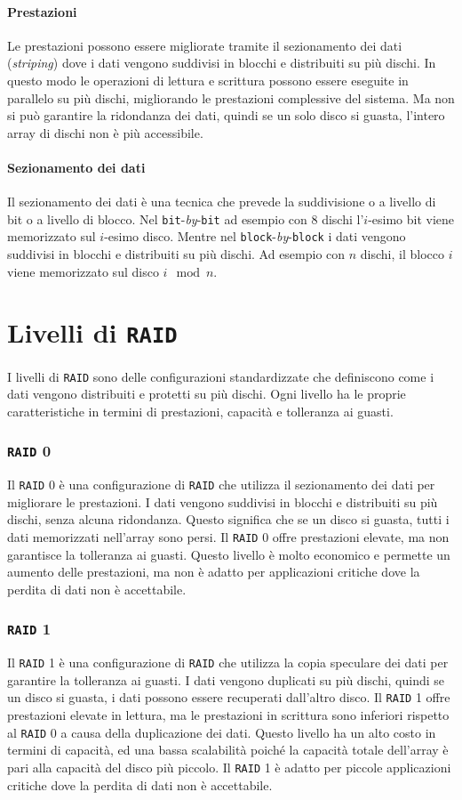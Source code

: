     \paragraph{Prestazioni} Le prestazioni possono essere migliorate tramite il sezionamento dei dati (\textit{striping}) dove i dati vengono suddivisi in blocchi e distribuiti su più dischi. In questo modo le operazioni di lettura e scrittura possono essere eseguite in parallelo su più dischi, migliorando le prestazioni complessive del sistema. Ma non si può garantire la ridondanza dei dati, quindi se un solo disco si guasta, l'intero array di dischi non è più accessibile.
    \paragraph{Sezionamento dei dati} Il sezionamento dei dati è una tecnica che prevede la suddivisione o a livello di bit o a livello di blocco. Nel \texttt{bit}-\textit{by}-\texttt{bit} ad esempio con 8 dischi l'$i$-esimo bit viene memorizzato sul $i$-esimo disco.  Mentre nel \texttt{block}-\textit{by}-\texttt{block} i dati vengono suddivisi in blocchi e distribuiti su più dischi. Ad esempio con $n$ dischi, il blocco $i$ viene memorizzato sul disco $i \mod n$. 
\section*{Livelli di \texttt{RAID}}
    I livelli di \texttt{RAID} sono delle configurazioni standardizzate che definiscono come i dati vengono distribuiti e protetti su più dischi. Ogni livello ha le proprie caratteristiche in termini di prestazioni, capacità e tolleranza ai guasti.
    \subsubsection{\texttt{RAID} 0}
        Il \texttt{RAID} 0 è una configurazione di \texttt{RAID} che utilizza il sezionamento dei dati per migliorare le prestazioni. I dati vengono suddivisi in blocchi e distribuiti su più dischi, senza alcuna ridondanza. Questo significa che se un disco si guasta, tutti i dati memorizzati nell'array sono persi. Il \texttt{RAID} 0 offre prestazioni elevate, ma non garantisce la tolleranza ai guasti. Questo livello è molto economico e permette un aumento delle prestazioni, ma non è adatto per applicazioni critiche dove la perdita di dati non è accettabile.
    \subsubsection{\texttt{RAID} 1}
        Il \texttt{RAID} 1 è una configurazione di \texttt{RAID} che utilizza la copia speculare dei dati per garantire la tolleranza ai guasti. I dati vengono duplicati su più dischi, quindi se un disco si guasta, i dati possono essere recuperati dall'altro disco. Il \texttt{RAID} 1 offre prestazioni elevate in lettura, ma le prestazioni in scrittura sono inferiori rispetto al \texttt{RAID} 0 a causa della duplicazione dei dati. Questo livello ha un alto costo in termini di capacità, ed una bassa scalabilità poiché la capacità totale dell'array è pari alla capacità del disco più piccolo. Il \texttt{RAID} 1 è adatto per piccole applicazioni critiche dove la perdita di dati non è accettabile.
